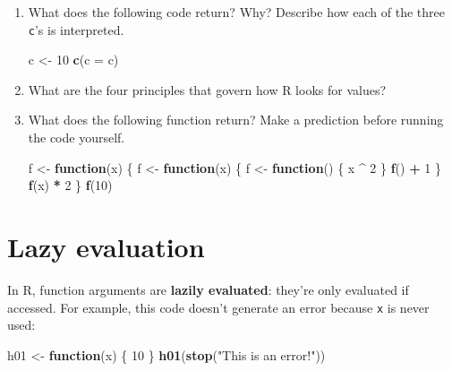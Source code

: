 \documentclass[]{book}
\newenvironment{Shaded}{\begin{snugshade}}{\end{snugshade}}
\newcommand{\KeywordTok}[1]{\textcolor[rgb]{0.13,0.29,0.53}{\textbf{#1}}}
\newcommand{\DataTypeTok}[1]{\textcolor[rgb]{0.13,0.29,0.53}{#1}}
\newcommand{\DecValTok}[1]{\textcolor[rgb]{0.00,0.00,0.81}{#1}}
\newcommand{\StringTok}[1]{\textcolor[rgb]{0.31,0.60,0.02}{#1}}
\newcommand{\ControlFlowTok}[1]{\textcolor[rgb]{0.13,0.29,0.53}{\textbf{#1}}}
\newcommand{\OperatorTok}[1]{\textcolor[rgb]{0.81,0.36,0.00}{\textbf{#1}}}
\newcommand{\NormalTok}[1]{#1}
\theoremstyle{definition}
\theoremstyle{definition}
\theoremstyle{definition}
\theoremstyle{remark}
\begin{document}
\begin{enumerate}
\def\labelenumi{\arabic{enumi}.}
\item
  What does the following code return? Why? Describe how each of the
  three \texttt{c}'s is interpreted.

\begin{Shaded}
\begin{Highlighting}[]
\NormalTok{c <-}\StringTok{ }\DecValTok{10}
\KeywordTok{c}\NormalTok{(}\DataTypeTok{c =}\NormalTok{ c)}
\end{Highlighting}
\end{Shaded}
\item
  What are the four principles that govern how R looks for values?
\item
  What does the following function return? Make a prediction before
  running the code yourself.

\begin{Shaded}
\begin{Highlighting}[]
\NormalTok{f <-}\StringTok{ }\ControlFlowTok{function}\NormalTok{(x) \{}
\NormalTok{  f <-}\StringTok{ }\ControlFlowTok{function}\NormalTok{(x) \{}
\NormalTok{    f <-}\StringTok{ }\ControlFlowTok{function}\NormalTok{() \{}
\NormalTok{      x }\OperatorTok{^}\StringTok{ }\DecValTok{2}
\NormalTok{    \}}
    \KeywordTok{f}\NormalTok{() }\OperatorTok{+}\StringTok{ }\DecValTok{1}
\NormalTok{  \}}
  \KeywordTok{f}\NormalTok{(x) }\OperatorTok{*}\StringTok{ }\DecValTok{2}
\NormalTok{\}}
\KeywordTok{f}\NormalTok{(}\DecValTok{10}\NormalTok{)}
\end{Highlighting}
\end{Shaded}
\end{enumerate}

\section{Lazy evaluation}\label{lazy-evaluation}

In R, function arguments are \textbf{lazily evaluated}: they're only
evaluated if accessed. For example, this code doesn't generate an error
because \texttt{x} is never used:

\begin{Shaded}
\begin{Highlighting}[]
\NormalTok{h01 <-}\StringTok{ }\ControlFlowTok{function}\NormalTok{(x) \{}
  \DecValTok{10}
\NormalTok{\}}
\KeywordTok{h01}\NormalTok{(}\KeywordTok{stop}\NormalTok{(}\StringTok{"This is an error!"}\NormalTok{))}
\end{Highlighting}
\end{Shaded}
\end{document}
